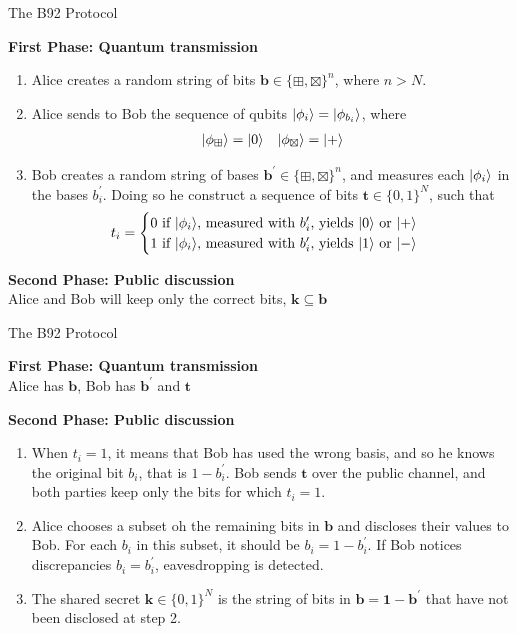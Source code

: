 \documentclass{beamer}
\newcommand{\comp}{\boxplus}
\newcommand{\diag}{\boxtimes}
\begin{document}
\begin{frame}{The B92 Protocol}%

	\textbf{First Phase: Quantum transmission}
	\begin{enumerate}
		\item Alice creates a random string of bits $\mathbf{b} \in \{\comp, \diag\}^n$, where $n > N$.
		\item Alice sends to Bob the sequence of qubits $\ket{\phi_{i}} = \ket{\phi_{b_i}}$, where		
	\begin{align*}
		&\ket{\phi_\comp} = \ket{0}  &\ket{\phi_\diag} = \ket{+}
	\end{align*}				
		\pause\item Bob creates a random string of bases $\mathbf{b}^\prime \in \{\comp, \diag\}^n$, and measures each $\ket{\phi_i}$ in the bases $b_i^\prime$. Doing so he construct a sequence of bits $\mathbf{t} \in \{0, 1\}^N$, such that
	\[ t_i = 
	\begin{cases}
	0 \text{ if $\ket{\phi_i}$, measured with $b_i^\prime$, yields $\ket{0}$ or $\ket{+}$} \\
	1 \text{ if $\ket{\phi_i}$, measured with $b_i^\prime$, yields $\ket{1}$ or $\ket{-}$}
	\end{cases}
	\]
	\end{enumerate}
	
	\textbf{Second Phase: Public discussion}	\\
	\hspace{5pt} Alice and Bob will keep only the correct bits, $\mathbf{k} \subseteq \mathbf{b}$
\end{frame}


	\begin{frame}{The B92 Protocol}%

	\textbf{First Phase: Quantum transmission}\\
	\hspace{5pt} Alice has $\mathbf{b}$, Bob has $\mathbf{b}^\prime$ and $\mathbf{t}$
	
	\textbf{Second Phase: Public discussion}
		\begin{enumerate}
		\item When $t_i = 1$, it means that Bob has used the wrong basis, and so he knows the original bit $b_i$, that is $1 - b_i^\prime$. Bob sends $\mathbf{t}$ over the public channel, and both parties keep only the bits for which $t_i = 1$.
		\pause\item Alice chooses a subset oh the remaining bits in $\mathbf{b}$ and discloses their values to Bob. For each $b_i$ in this subset, it should be $b_i = 1-b_i^\prime$. If Bob notices discrepancies $b_i = b_i^\prime$, eavesdropping is detected.
		\item The shared secret $\mathbf{k} \in \{0, 1\}^N$ is the string of bits in $\mathbf{b} = \mathbf{1-b}^\prime$ that have not been disclosed at step 2.
		\end{enumerate}	
\end{frame}
\end{document}
